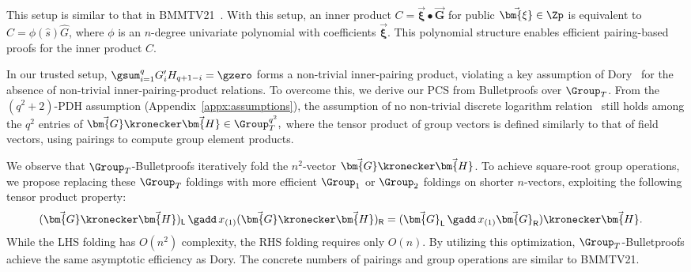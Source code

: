 This setup is similar to that in BMMTV21~\cite{asiacrypt/BuenzMMTV21}.
With this setup, an inner product $C = \vec{\bm{\xi}} \bullet \vec{\bm{G}}$ for public $\vec{\bm{\xi}} \in \Zp$ is equivalent to $C = \phi(\hat{s})\hat{G}$, where $\phi$ is an $n$-degree univariate polynomial with coefficients $\vec{\bm{\xi}}$.
This polynomial structure enables efficient pairing-based proofs for the inner product $C$.

In our trusted setup,
\(
 	\gsum_{i=1}^q G'_i H_{q+1-i} = \gzero
\)
forms a non-trivial inner-pairing product, 
violating a key assumption of Dory~\cite[Lemma~1]{tcc/Lee21}
for the absence of non-trivial inner-pairing-product relations.
To overcome this, we derive our PCS from Bulletproofs over $\Group_T$.
From the $(q^2 + 2)$-PDH assumption (Appendix~\ref{appx:assumptions}),
the assumption of no non-trivial discrete logarithm relation~\cite[Definition~1]{sp/BuenzBBPWM18} 
still holds 
among the $q^2$ entries of
\(
 	\vec{\bm{G}} \kronecker \vec{\bm{H}} \in \Group_T^{q^2},
\)
where the tensor product of group vectors is defined similarly to that of field vectors,
using pairings to compute group element products.

We observe that 
$\Group_T$-Bulletproofs iteratively fold the $n^2$-vector $\vec{\bm{G}} \kronecker \vec{\bm{H}}$.
To achieve square-root 
group operations,
we propose replacing these $\Group_T$ foldings with more efficient $\Group_1$ or $\Group_2$ foldings on shorter $n$-vectors,
exploiting the following tensor product property:
\begin{align*}
& (\vec{\bm{G}}
	\kronecker 
	\vec{\bm{H}})_\mathsf{L} \,
\gadd \, 
x_{(1)} 
	(\vec{\bm{G}}
	\kronecker
	\vec{\bm{H}})_\mathsf{R} =
	(\vec{\bm{G}}_\mathsf{L} \, \gadd \, x_{(1)}\vec{\bm{G}}_\mathsf{R}) \kronecker \vec{\bm{H}}.
\end{align*}
While the LHS folding has $O(n^2)$ complexity, 
the RHS folding requires only $O(n)$.
By utilizing this optimization, $\Group_T$-Bulletproofs achieve the same asymptotic efficiency as Dory.
The concrete numbers of pairings and group operations are similar to BMMTV21.

